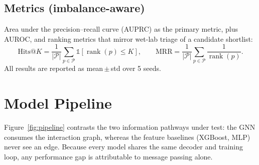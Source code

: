 \documentclass[11pt]{article}
\begin{document}
\subsection{Metrics (imbalance-aware)}
Area under the precision--recall curve (AUPRC) as the primary metric, plus
AUROC, and ranking metrics that mirror wet-lab triage of a candidate shortlist:
\begin{equation}
\mathrm{Hits}@K = \frac{1}{|\mathcal{P}|}\sum_{p\in\mathcal{P}}
\mathbb{1}[\operatorname{rank}(p)\le K],
\qquad
\mathrm{MRR} = \frac{1}{|\mathcal{P}|}\sum_{p\in\mathcal{P}}
\frac{1}{\operatorname{rank}(p)} .
\label{eq:rank}
\end{equation}
All results are reported as mean\,$\pm$\,std over 5 seeds.

\section{Model Pipeline}

Figure~\ref{fig:pipeline} contrasts the two information pathways under test: the
GNN consumes the interaction graph, whereas the feature baselines (XGBoost, MLP)
never see an edge. Because every model shares the same decoder and training
loop, any performance gap is attributable to message passing alone.
\end{document}
